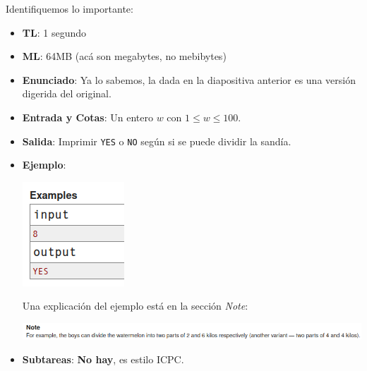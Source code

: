 \documentclass{beamer}
\begin{document}
    \begin{frame}[noframenumbering]
        Identifiquemos lo importante: \pause
        \begin{itemize}
            \item \textbf{TL}: 1 segundo \pause
            \item \textbf{ML}: 64MB (acá son megabytes, no mebibytes) \pause
            \item \textbf{Enunciado}: Ya lo sabemos, la dada en la diapositiva anterior es una versión digerida del original. \pause
            \item \textbf{Entrada y Cotas}: Un entero $w$ con $1 \leq w \leq 100$. \pause
            \item \textbf{Salida}: Imprimir \texttt{YES} o \texttt{NO} según si se puede dividir la sandía. \pause
            \item \textbf{Ejemplo}: 
                \begin{center}
                    \includegraphics[height=.2\textheight]{./res/cf_example.png}
                \end{center} \pause
                Una explicación del ejemplo está en la sección \textit{Note}:

                \begin{center}
                    \includegraphics[width=.9\linewidth]{./res/cf_note.png}
                \end{center} \pause
            \item \textbf{Subtareas}: \textbf{No hay}, es estilo ICPC.
        \end{itemize}
    \end{frame}
\end{document}
